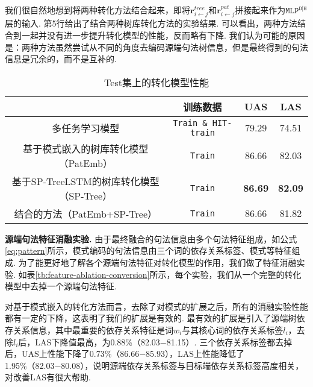 我们很自然地想到将两种转化方法结合起来，即将$\mathbf{r}^{tree}_{i \leftarrow j}$和$\mathbf{r}^{pat}_{i \leftarrow j}$拼接起来作为$\texttt{MLP}^{\texttt{D|H}}$层的输入. 第5行给出了结合两种树库转化方法的实验结果. 可以看出，两种方法结合到一起并没有进一步提升转化模型的性能，反而略有下降. 我们认为可能的原因是：两种方法虽然尝试从不同的角度去编码源端句法树信息，但是最终得到的句法信息是冗余的，而不是互补的.
\begin{table}[hb!]
    \centering
    \caption{Test集上的转化模型性能}
    \label{tb:HIT-conversion-rst}
    \begin{tabular}{c c c c}%
        \toprule
                                                 & 训练数据                    & UAS            & LAS            \\ %
        \midrule
        多任务学习模型                           & \texttt{Train \& HIT-train} & 79.29          & 74.51          \\
        \midrule
        基于模式嵌入的树库转化模型（PatEmb）     & \texttt{Train}              & 86.66          & 82.03          \\
        基于SP-TreeLSTM的树库转化模型（SP-Tree） & \texttt{Train}              & \textbf{86.69} & \textbf{82.09} \\
        结合的方法（PatEmb+SP-Tree）             & \texttt{Train}              & 86.66          & 81.82          \\
        \bottomrule
    \end{tabular}
\end{table}

\textbf{源端句法特征消融实验.  }
由于最终融合的句法信息由多个句法特征组成，如公式\ref{eq:pattern}所示，模式编码的句法信息由三个词的依存关系标签、模式等特征组成. 为了能更好地了解各个源端句法特征对转化模型的作用，我们做了特征消融实验. 如表\ref{tb:feature-ablation-conversion}所示，每个实验，我们从一个完整的转化模型中去掉一个源端句法特征.

对基于模式嵌入的转化方法而言，去除了对模式的扩展之后，所有的消融实验性能都有一定的下降，这表明了我们的扩展是有效的.
最有效的扩展是引入了源端树依存关系信息，其中最重要的依存关系特征是词$w_i$与其核心词的依存关系标签$l_i$，去除$l_i$后，LAS下降值最高，为0.88\%（82.03−81.15）.
三个依存关系标签都去掉后，UAS上性能下降了0.73\%（86.66−85.93），LAS上性能降低了1.95\%（82.03−80.08），说明源端依存关系标签与目标端依存关系标签高度相关，对改善LAS有很大帮助.

